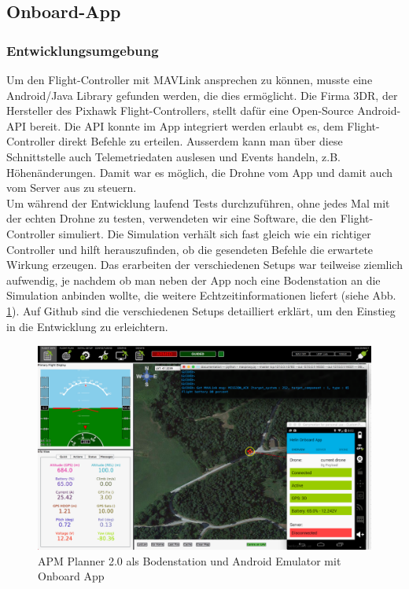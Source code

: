 \subsection{Onboard-App}

\subsubsection{Entwicklungsumgebung}
Um den \Gls{Flight-Controller} mit \Gls{MAVLink} ansprechen zu können, musste eine Android/Java Library gefunden werden, die dies ermöglicht. Die Firma 3DR, der Hersteller des Pixhawk Flight-Controllers, stellt dafür eine Open-Source Android-API bereit. Die API konnte im App integriert werden erlaubt es, dem Flight-Controller direkt Befehle zu erteilen. Ausserdem kann man über diese Schnittstelle auch Telemetriedaten auslesen und Events handeln, z.B. Höhenänderungen. Damit war es möglich, die Drohne vom App und damit auch vom Server aus zu steuern.\\

Um während der Entwicklung laufend Tests durchzuführen, ohne jedes Mal mit der echten Drohne zu testen, verwendeten wir eine Software, die den Flight-Controller simuliert. Die Simulation verhält sich fast gleich wie ein richtiger Controller und hilft herauszufinden, ob die gesendeten Befehle die erwartete Wirkung erzeugen. Das erarbeiten der verschiedenen Setups war teilweise ziemlich aufwendig, je nachdem ob man neben der App noch eine Bodenstation an die Simulation anbinden wollte, die weitere Echtzeitinformationen liefert (siehe Abb. \ref{fig:test-setup-onboard}). Auf Github sind die verschiedenen Setups detailliert erklärt, um den Einstieg in die Entwicklung zu erleichtern.

\begin{figure}[H]
	\includegraphics[width=1.0\textwidth]{images/test-setup-onboard.png}
	\caption{APM Planner 2.0 als Bodenstation und Android Emulator mit Onboard App}
	\label{fig:test-setup-onboard}
\end{figure}

